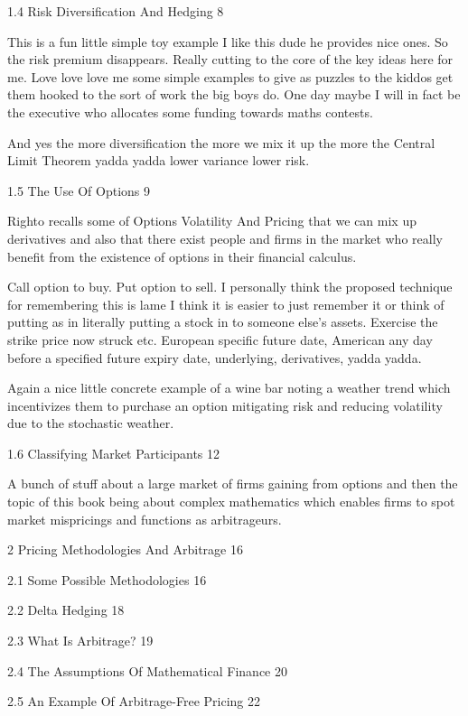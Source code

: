 1.4 Risk Diversification And Hedging 8

This is a fun little simple toy example I like this dude he provides nice ones. So the risk premium disappears. Really cutting to the core of the key ideas here for me. Love love love me some simple examples to give as puzzles to the kiddos get them hooked to the sort of work the big boys do. One day maybe I will in fact be the executive who allocates some funding towards maths contests.

And yes the more diversification the more we mix it up the more the Central Limit Theorem yadda yadda lower variance lower risk.

1.5 The Use Of Options 9

Righto recalls some of Options Volatility And Pricing that we can mix up derivatives and also that there exist people and firms in the market who really benefit from the existence of options in their financial calculus.

Call option to buy. Put option to sell. I personally think the proposed technique for remembering this is lame I think it is easier to just remember it or think of putting as in literally putting a stock in to someone else's assets. Exercise the strike price now struck etc. European specific future date, American any day before a specified future expiry date, underlying, derivatives, yadda yadda.

Again a nice little concrete example of a wine bar noting a weather trend which incentivizes them to purchase an option mitigating risk and reducing volatility due to the stochastic weather.

1.6 Classifying Market Participants 12

A bunch of stuff about a large market of firms gaining from options and then the topic of this book being about complex mathematics which enables firms to spot market mispricings and functions as arbitrageurs.

2 Pricing Methodologies And Arbitrage 16



2.1 Some Possible Methodologies 16



2.2 Delta Hedging 18



2.3 What Is Arbitrage? 19



2.4 The Assumptions Of Mathematical Finance 20



2.5 An Example Of Arbitrage-Free Pricing 22



